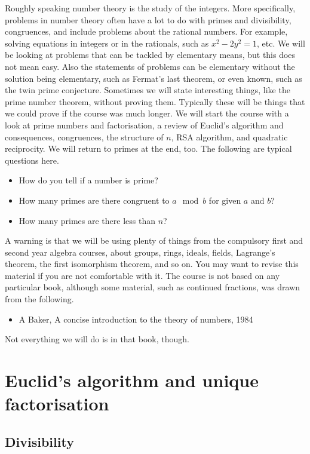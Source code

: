 Roughly speaking number theory is the study of the integers. More specifically, problems in number theory often have a lot to do with primes and divisibility, congruences, and include problems about the rational numbers. For example, solving equations in integers or in the rationals, such as $ x^2 - 2y^2 = 1 $, etc. We will be looking at problems that can be tackled by elementary means, but this does not mean easy. Also the statements of problems can be elementary without the solution being elementary, such as Fermat's last theorem, or even known, such as the twin prime conjecture. Sometimes we will state interesting things, like the prime number theorem, without proving them. Typically these will be things that we could prove if the course was much longer. We will start the course with a look at prime numbers and factorisation, a review of Euclid's algorithm and consequences, congruences, the structure of $ \unit{n} $, RSA algorithm, and quadratic reciprocity. We will return to primes at the end, too. The following are typical questions here.
\begin{itemize}
\item How do you tell if a number is prime?
\item How many primes are there congruent to $ a \mod b $ for given $ a $ and $ b $?
\item How many primes are there less than $ n $?
\end{itemize}
A warning is that we will be using plenty of things from the compulsory first and second year algebra courses, about groups, rings, ideals, fields, Lagrange's theorem, the first isomorphism theorem, and so on. You may want to revise this material if you are not comfortable with it. The course is not based on any particular book, although some material, such as continued fractions, was drawn from the following.
\begin{itemize}
\item A Baker, A concise introduction to the theory of numbers, 1984
\end{itemize}
Not everything we will do is in that book, though.

\pagebreak

\section{Euclid's algorithm and unique factorisation}

\subsection{Divisibility}

